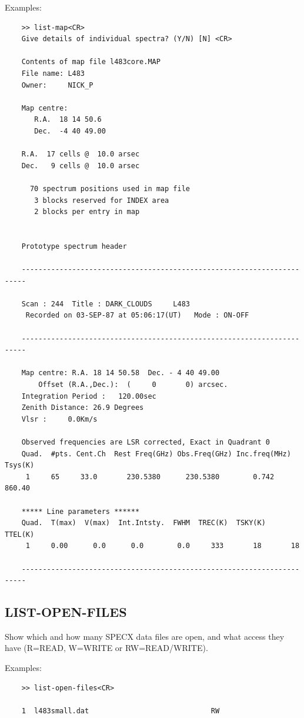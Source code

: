 \documentclass[11pt,twoside]{report}
\begin{document}
Examples:
\begin{verbatim}
    >> list-map<CR>
    Give details of individual spectra? (Y/N) [N] <CR>

    Contents of map file l483core.MAP
    File name: L483
    Owner:     NICK_P

    Map centre:
       R.A.  18 14 50.6
       Dec.  -4 40 49.00

    R.A.  17 cells @  10.0 arsec
    Dec.   9 cells @  10.0 arsec

      70 spectrum positions used in map file
       3 blocks reserved for INDEX area
       2 blocks per entry in map


    Prototype spectrum header

    -----------------------------------------------------------------------

    Scan : 244  Title : DARK_CLOUDS     L483      
     Recorded on 03-SEP-87 at 05:06:17(UT)   Mode : ON-OFF

    -----------------------------------------------------------------------

    Map centre: R.A. 18 14 50.58  Dec. - 4 40 49.00
        Offset (R.A.,Dec.):  (     0       0) arcsec.
    Integration Period :   120.00sec
    Zenith Distance: 26.9 Degrees
    Vlsr :     0.0Km/s

    Observed frequencies are LSR corrected, Exact in Quadrant 0
    Quad.  #pts. Cent.Ch  Rest Freq(GHz) Obs.Freq(GHz) Inc.freq(MHz) Tsys(K)
     1     65     33.0       230.5380      230.5380        0.742    860.40    

    ***** Line parameters ******
    Quad.  T(max)  V(max)  Int.Intsty.  FWHM  TREC(K)  TSKY(K)  TTEL(K)
     1     0.00      0.0      0.0        0.0     333       18       18

    -----------------------------------------------------------------------

\end{verbatim}

\subsection{LIST-OPEN-FILES} 

Show which and how many SPECX data files are open, and what access they have
(R=READ, W=WRITE or RW=READ/WRITE).

Examples:
\begin{verbatim}
    >> list-open-files<CR>

    1  l483small.dat                             RW

\end{verbatim}
\end{document}
